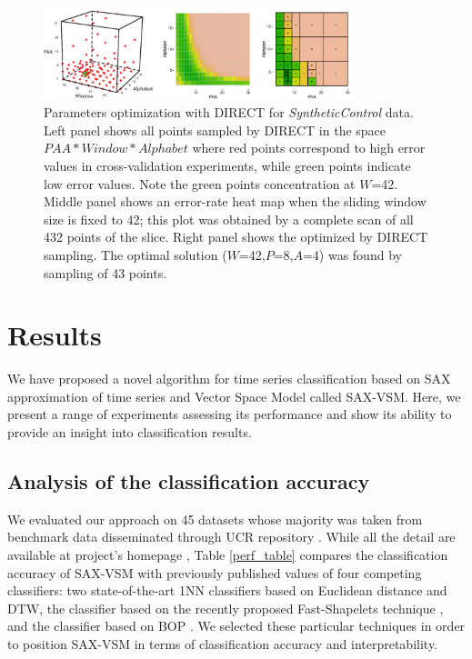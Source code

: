 \documentclass[conference]{IEEEtran}
\begin{document}
\begin{figure}[t]
   \centering
   \includegraphics[width=90mm]{figures/figure_direct.eps}
   \caption{Parameters optimization with DIRECT for \textit{SyntheticControl} data. 
   Left panel shows all points sampled by DIRECT in the space $PAA*Window*Alphabet$ where
   red points correspond to high error values in cross-validation experiments, 
   while green points indicate low error values. 
   Note the green points concentration at $W$=42. 
   Middle panel shows an error-rate heat map when the sliding window size is fixed to 42; 
   this plot was obtained by a complete scan of all 432 points of the slice. 
   Right panel shows the optimized by DIRECT sampling. The optimal solution 
   ($W$=42,$P$=8,$A$=4) was found by sampling of 43 points.}
   \label{fig:direct-sampling}
\end{figure}

\section{Results} \label{results}
We have proposed a novel algorithm for time series classification based on SAX
approximation of time series and Vector Space Model called SAX-VSM. 
Here, we present a range of experiments assessing its performance and show its 
ability to provide an insight into classification results.

\subsection{Analysis of the classification accuracy}
We evaluated our approach on 45 datasets whose majority was taken from benchmark 
data disseminated through UCR repository \cite{ucr}. While all the detail are available at 
project's homepage \cite{jmotif}, Table \ref{perf_table} compares the classification accuracy 
of SAX-VSM with previously published values of four competing classifiers: 
two state-of-the-art 1NN classifiers based on Euclidean distance and DTW, 
the classifier based on the recently proposed Fast-Shapelets technique \cite{fast-shapelets}, 
and the classifier based on BOP \cite{bag_patterns}.
We selected these particular techniques in order to position SAX-VSM in terms of 
classification accuracy and interpretability. 
\end{document}
